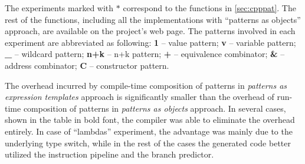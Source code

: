 %

The experiments marked with $*$ correspond to the 
functions in \textsection\ref{sec:cpppat}. The rest of the functions, 
including all the implementations with ``patterns as objects'' approach, are 
available on the project's web page. The patterns involved in each experiment are abbreviated as following:
{\bf 1}   -- value pattern;
{\bf v}   -- variable pattern;
{\bf \_}  -- wildcard pattern;
{\bf n+k} -- n+k pattern;
{\bf +}   -- equivalence combinator;
{\bf \&}  -- address combinator;
{\bf C}   -- constructor pattern.


The overhead incurred by compile-time composition of 
patterns in \emph{patterns as expression templates} approach is significantly 
smaller than the overhead of run-time composition of patterns in \emph{patterns 
as objects} approach. In several cases, shown in the table in bold 
font, the compiler was able to eliminate the overhead entirely. In case of ``lambdas'' experiment, the advantage was mainly due 
to the underlying type switch, while in the rest of the cases the generated code
better utilized the instruction pipeline and the branch predictor.

